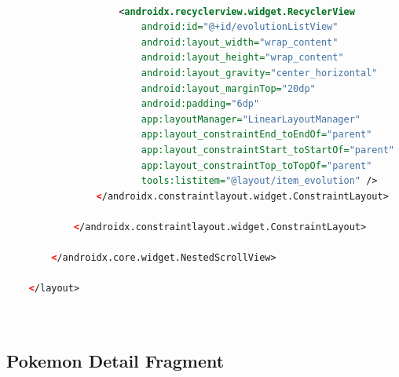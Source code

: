 \documentclass[a4paper, 12pt]{article}
\begin{document}
\begin{lstlisting}[caption={Pokemon Detail Layout.}, label={layout:pk_detail}, language=XML]
    
                    <androidx.recyclerview.widget.RecyclerView
                        android:id="@+id/evolutionListView"
                        android:layout_width="wrap_content"
                        android:layout_height="wrap_content"
                        android:layout_gravity="center_horizontal"
                        android:layout_marginTop="20dp"
                        android:padding="6dp"
                        app:layoutManager="LinearLayoutManager"
                        app:layout_constraintEnd_toEndOf="parent"
                        app:layout_constraintStart_toStartOf="parent"
                        app:layout_constraintTop_toTopOf="parent"
                        tools:listitem="@layout/item_evolution" />
                </androidx.constraintlayout.widget.ConstraintLayout>
    
            </androidx.constraintlayout.widget.ConstraintLayout>
    
        </androidx.core.widget.NestedScrollView>
    
    </layout>

    

\end{lstlisting}  

\subsection{Pokemon Detail Fragment}
\end{document}
